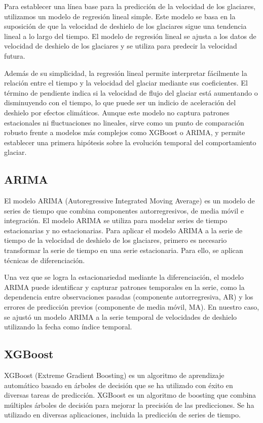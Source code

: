 \documentclass[sigconf,authordraft,language=spanish]{acmart}
\begin{document}
Para establecer una línea base para la predicción de la velocidad de los glaciares, utilizamos un modelo de regresión lineal simple.
Este modelo se basa en la suposición de que la velocidad de deshielo de los glaciares sigue una tendencia lineal a lo largo del tiempo.
El modelo de regresión lineal se ajusta a los datos de velocidad de deshielo de los glaciares y se utiliza para predecir la velocidad futura.

Además de su simplicidad, la regresión lineal permite interpretar fácilmente la relación entre el tiempo y la velocidad del glaciar mediante sus coeficientes. 
El término de pendiente indica si la velocidad de flujo del glaciar está aumentando o disminuyendo con el tiempo, lo que puede ser un indicio
 de aceleración del deshielo por efectos climáticos. Aunque este modelo no captura patrones estacionales ni fluctuaciones no lineales, sirve como un punto 
 de comparación robusto frente a modelos más complejos como XGBoost o ARIMA, y permite establecer una primera hipótesis sobre la evolución
  temporal del comportamiento glaciar.

\subsection{ARIMA}

El modelo ARIMA (Autoregressive Integrated Moving Average) es un modelo de series de tiempo que combina componentes autorregresivos, de media móvil e integración.
El modelo ARIMA se utiliza para modelar series de tiempo estacionarias y no estacionarias.
Para aplicar el modelo ARIMA a la serie de tiempo de la velocidad de deshielo de los glaciares, primero es necesario transformar la serie de tiempo en una serie estacionaria.
Para ello, se aplican técnicas de diferenciación.

Una vez que se logra la estacionariedad mediante la diferenciación, el modelo ARIMA puede identificar y capturar patrones temporales en la serie, como la dependencia 
entre observaciones pasadas (componente autorregresiva, AR) y los errores de predicción previos (componente de media móvil, MA). En nuestro caso, se ajustó un modelo ARIMA a 
la serie temporal de velocidades de deshielo utilizando la fecha como índice temporal.

\subsection{XGBoost}

XGBoost (Extreme Gradient Boosting) es un algoritmo de aprendizaje automático basado en árboles de decisión que se ha utilizado con éxito en diversas tareas de predicción.
XGBoost es un algoritmo de boosting que combina múltiples árboles de decisión para mejorar la precisión de las predicciones.
Se ha utilizado en diversas aplicaciones, incluida la predicción de series de tiempo.
\end{document}
